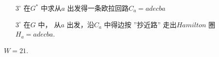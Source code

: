 \documentclass{article}
\begin{document}
\begin{enumerate}
\begin{enumerate}
        \item [$3^\circ$]在$G^* $ 中求从$a$ 出发得一条欧拉回路$C_a =adecba $
        \item [$3^\circ$]在$G$ 中， 从$a$ 出发，沿$C_a$ 中得边按 ''抄近路'' 走出$Hamilton$ 圈$H_a = adecba$.
    \end{enumerate}
    $W=21$.
\end{enumerate}
\end{document}
